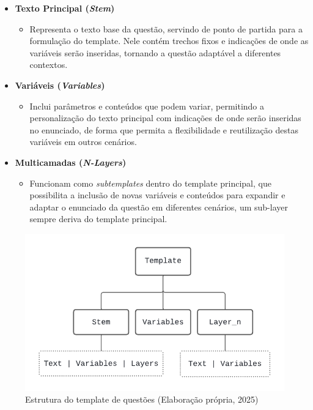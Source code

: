 \begin{itemize} \item \textbf{Texto Principal (\textit{Stem})} \begin{itemize} \item Representa o texto base da questão, servindo de ponto de partida para a formulação do template. Nele contém trechos fixos e indicações de onde as variáveis serão inseridas, tornando a questão adaptável a diferentes contextos. \end{itemize}
\item \textbf{Variáveis (\textit{Variables})}
\begin{itemize}
    \item Inclui parâmetros e conteúdos que podem variar, permitindo a personalização do texto principal com indicações de onde serão inseridas no enunciado, de forma que permita a flexibilidade e reutilização destas variáveis em outros cenários.
\end{itemize}

\item \textbf{Multicamadas (\textit{N-Layers})}
\begin{itemize}
    \item Funcionam como \textit{subtemplates} dentro do template principal, que possibilita a inclusão de novas variáveis e conteúdos para expandir e adaptar o enunciado da questão em diferentes cenários, um sub-layer sempre deriva do template principal.
    \end{itemize}
\end{itemize}


\begin{figure}[ht]
	\centering
	\includegraphics[width=14cm]{./imagens/capitulo5/template-json-example-1}
	\caption{Estrutura do template de questões (Elaboração própria, 2025) }
	\label{fig:template-json-example-1}
\end{figure}


